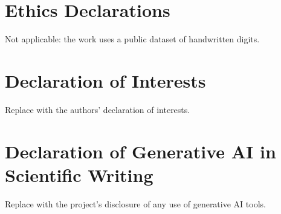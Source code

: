 

\section*{Ethics Declarations}
Not applicable: the work uses a public dataset of handwritten digits.
\label{ethics declarations}

\section*{Declaration of Interests}
Replace with the authors' declaration of interests.
\label{declaration of interests}

\section*{Declaration of Generative AI in Scientific Writing}
Replace with the project's disclosure of any use of generative AI tools.
\label{declaration of generative ai in scientific writing}

